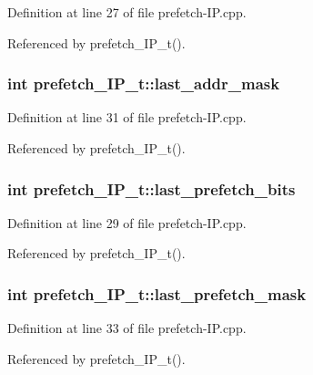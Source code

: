 Definition at line 27 of file prefetch-IP.cpp.

Referenced by prefetch\_\-IP\_\-t().
\subsubsection[{last\_\-addr\_\-mask}]{\setlength{\rightskip}{0pt plus 5cm}int {\bf prefetch\_\-IP\_\-t::last\_\-addr\_\-mask}\hspace{0.3cm}{\tt  [protected]}}\label{classprefetch__IP__t_c4b36429307b086b7ce8f347ca806877}




Definition at line 31 of file prefetch-IP.cpp.

Referenced by prefetch\_\-IP\_\-t().
\subsubsection[{last\_\-prefetch\_\-bits}]{\setlength{\rightskip}{0pt plus 5cm}int {\bf prefetch\_\-IP\_\-t::last\_\-prefetch\_\-bits}\hspace{0.3cm}{\tt  [protected]}}\label{classprefetch__IP__t_a3f067556e9eae5881a2cc53a1171af4}




Definition at line 29 of file prefetch-IP.cpp.

Referenced by prefetch\_\-IP\_\-t().
\subsubsection[{last\_\-prefetch\_\-mask}]{\setlength{\rightskip}{0pt plus 5cm}int {\bf prefetch\_\-IP\_\-t::last\_\-prefetch\_\-mask}\hspace{0.3cm}{\tt  [protected]}}\label{classprefetch__IP__t_5f16a68eb72f82e4ea26e2f954ee5b60}




Definition at line 33 of file prefetch-IP.cpp.

Referenced by prefetch\_\-IP\_\-t().
